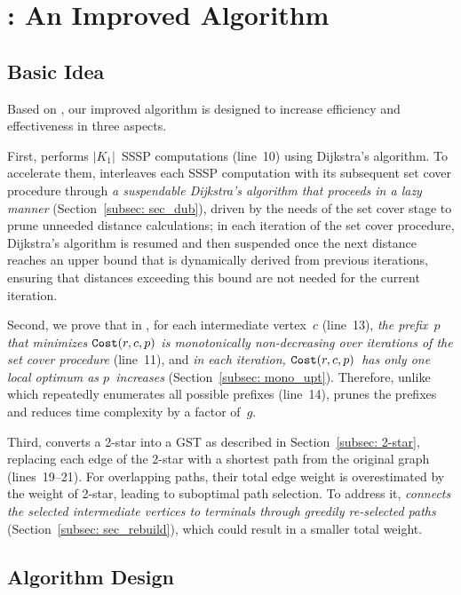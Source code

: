 \section{\Improved: An Improved Algorithm}
\label{sec: improved}

\subsection{Basic Idea}
\label{sec: improved-basic-idea}

Based on \Basic, our improved algorithm \Improved is designed to increase efficiency and effectiveness in three aspects.

First, \Basic performs $|K_1|$~SSSP computations (line~10) using Dijkstra's algorithm.
To accelerate them, \Improved interleaves each SSSP computation with its subsequent set cover procedure through \emph{a suspendable Dijkstra's algorithm that proceeds in a lazy manner} (Section~\ref{subsec: sec_dub}), driven by the needs of the set cover stage to prune unneeded distance calculations; in each iteration of the set cover procedure, Dijkstra's algorithm is resumed and then suspended once the next distance reaches an upper bound that is dynamically derived from previous iterations, ensuring that distances exceeding this bound are not needed for the current iteration.

Second, we prove that in \Basic, for each intermediate vertex~$c$ (line~13), \emph{the prefix~$p$ that minimizes $\mathtt{Cost}(r,c,p)$ is monotonically non-decreasing over iterations of the set cover procedure} (line~11), and \emph{in each iteration, $\mathtt{Cost}(r,c,p)$~has only one local optimum as $p$~increases} (Section~\ref{subsec: mono_upt}). Therefore, unlike \Basic which repeatedly enumerates all possible prefixes (line~14), \Improved prunes the prefixes and reduces time complexity by a factor of~$g$.

Third, \Basic converts a 2-star into a GST as described in Section~\ref{subsec: 2-star}, replacing each edge of the 2-star with a shortest path from the original graph (lines~19--21). For overlapping paths, their total edge weight is overestimated by the weight of 2-star, leading to suboptimal path selection. To address it, \Improved \emph{connects the selected intermediate vertices to terminals through greedily re-selected paths} (Section~\ref{subsec: sec_rebuild}), which could result in a smaller total weight.

\subsection{Algorithm Design}
\label{subsec: improved-design}

